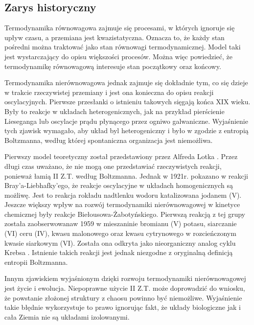 \documentclass[10pt, a4paper, twoside, onecolumn]{article}
\numberwithin{equation}{section}
\begin{document}
	\subsection{Zarys historyczny}
	Termodynamika równowagowa zajmuje się procesami, w których ignoruje się upływ czasu, a przemiana jest kwazistatyczna. Oznacza to, że każdy stan pośredni można traktować jako stan równowagi termodynamicznej. Model taki jest wystarczający do opisu większości procesów. Można więc powiedzieć, że termodynamikę równowagową interesuje stan początkowy oraz końcowy. \par
	Termodynamika nierównowagowa jednak zajmuje się dokładnie tym, co się dzieje w trakcie rzeczywistej przemiany i jest ona konieczna do opisu reakcji oscylacyjnych. Pierwsze przesłanki o istnieniu takowych sięgają końca XIX wieku. Były to reakcje w układach heterogenicznych, jak na przykład pierścienie Lieseganga lub oscylacje prądu płynącego przez ogniwo galwaniczne. Wyjaśnienie tych zjawisk wymagało, aby układ byl heterogeniczny i było w zgodzie z entropią Boltzmanna, według której spontaniczna organizacja jest niemożliwa. \cite{orlik}\par
	Pierwszy model teoretyczny został przedstawiony przez Alfreda Lotka \cite{lotka}. Przez długi czas uważano, że nie mogą one przedstawiać rzeczywistych reakcji, ponieważ łamią II Z.T. według Boltzmanna. Jednak w 1921r. pokazano w reakcji Bray'a-Liebhafky'ego, że reakcje oscylacyjne w układach homogenicznych są możliwę. Jest to reakcja rokładu nadtlenku wodoru katalizowana jodanem (V). Jeszcze większy wpływ na rozwój termodynamiki nierównowagowej w kinetyce chemicznej były reakcje Biełousowa-Żabotyńskiego. Pierwszą reakcją z tej grupy została zaobserwowanaw 1959 w mieszaninie bromianu (V) potasu, siarczanie (VI) ceru (IV), kwasu malonowego oraz kwasu cytrynowego w rozcieńczonym kwasie siarkowym (VI). Została ona odkryta jako nieorganiczny analog cyklu Krebsa \cite{belousov_hist}. Istnienie takich reakcji jest jednak niezgodne z oryginalną definicją entropii Boltzmanna. \par
	Innym zjawiskiem wyjaśnionym dzięki rozwoju termodynamiki nierównowagowej jest życie i ewolucja. Niepoprawne użycie II Z.T. może doprowadzić do wniosku, że powstanie złożonej struktury z chaosu powinno być niemożliwe. Wyjaśnienie takie błędnie wykorzystuje to prawo ignorując fakt, że układy biologiczne jak i cała Ziemia nie są układami izolowanymi. \par
	
\end{document}
